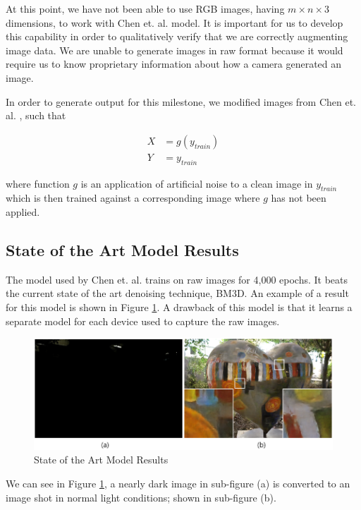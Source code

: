 \documentclass{article}
\begin{document}
At this point, we have not been able to use RGB images, having
$m \times n \times 3$ dimensions, to work with Chen et. al.
\cite{chen2018learning} model. It is important for us to develop this
capability in order to qualitatively verify that we are correctly augmenting
image data. We are unable to generate images in raw format because
it would require us to know proprietary information about how a camera
generated an image.

In order to generate output for this milestone, we modified images from
Chen et. al. \cite{chen2018learning}, such that

\begin{align*}
  X &= g(y_{train})\\
  Y &= y_{train}
\end{align*}

where function $g$ is an application of artificial noise to a clean
image in $y_{train}$ which is then trained against a corresponding
image where $g$ has not been applied.

\subsection{State of the Art Model Results}

The model used by Chen et. al. \cite{chen2018learning} trains on raw
images for 4,000 epochs. It beats the current state of the art denoising
technique, BM3D. An example of a result for this model is shown in
Figure \ref{fig:train}. A drawback of this model is that it learns a
separate model for each device used to capture the raw images.

\begin{figure}[ht]
  \centering
  \includegraphics[scale=0.35]{Their_results}
  \caption{ State of the Art Model Results}
  \label{fig:train}
\end{figure}

We can see in Figure \ref{fig:train}, a nearly dark image in sub-figure
(a) is converted to an image shot in normal light conditions; shown
in sub-figure (b).
\end{document}

